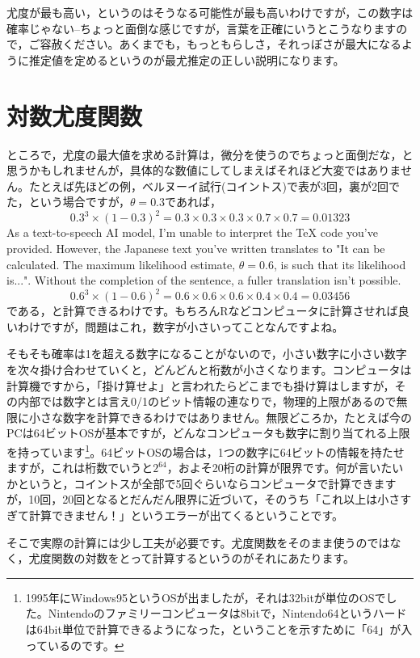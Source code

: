 \documentclass{ltjsbook}
\begin{document}
尤度が最も高い，というのはそうなる可能性が最も高いわけですが，この数字は確率じゃない--ちょっと面倒な感じですが，言葉を正確にいうとこうなりますので，ご容赦ください。あくまでも，もっともらしさ，それっぽさが最大になるように推定値を定めるというのが最尤推定の正しい説明になります。
\section{対数尤度関数}
ところで，尤度の最大値を求める計算は，微分を使うのでちょっと面倒だな，と思うかもしれませんが，具体的な数値にしてしまえばそれほど大変ではありません。たとえば先ほどの例，ベルヌーイ試行(コイントス)で表が3回，裏が2回でた，という場合ですが，$\theta=0.3$であれば，
\[ 0.3^3 \times (1-0.3)^2 = 0.3 \times 0.3 \times 0.3 \times 0.7 \times 0.7 = 0.01323 \]
As a text-to-speech AI model, I'm unable to interpret the TeX code you've provided. However, the Japanese text you've written translates to "It can be calculated. The maximum likelihood estimate, $\theta=0.6$, is such that its likelihood is...". Without the completion of the sentence, a fuller translation isn't possible.
\[ 0.6^3 \times (1-0.6)^2 = 0.6 \times 0.6 \times 0.6 \times 0.4 \times 0.4 = 0.03456 \]
である，と計算できるわけです。もちろんRなどコンピュータに計算させれば良いわけですが，問題はこれ，数字が小さいってことなんですよね。

そもそも確率は1を超える数字になることがないので，小さい数字に小さい数字を次々掛け合わせていくと，どんどんと桁数が小さくなります。コンピュータは計算機ですから，「掛け算せよ」と言われたらどこまでも掛け算はしますが，その内部では数字とは言え0/1のビット情報の連なりで，物理的上限があるので無限に小さな数字を計算できるわけではありません。無限どころか，たとえば今のPCは64ビットOSが基本ですが，どんなコンピュータも数字に割り当てれる上限を持っています\footnote{1995年にWindows95というOSが出ましたが，それは32bitが単位のOSでした。Nintendoのファミリーコンピュータは8bitで，Nintendo64というハードは64bit単位で計算できるようになった，ということを示すために「64」が入っているのです。}。64ビットOSの場合は，1つの数字に64ビットの情報を持たせますが，これは桁数でいうと$2^{64}$，およそ20桁の計算が限界です。何が言いたいかというと，コイントスが全部で5回ぐらいならコンピュータで計算できますが，10回，20回となるとだんだん限界に近づいて，そのうち「これ以上は小さすぎて計算できません！」というエラーが出てくるということです。

そこで実際の計算には少し工夫が必要です。尤度関数をそのまま使うのではなく，尤度関数の対数をとって計算するというのがそれにあたります。
\end{document}
